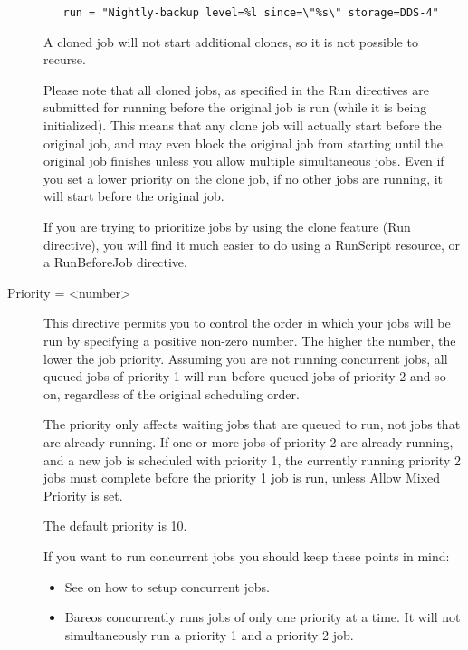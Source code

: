 \begin{description}
\begin{verbatim}
   run = "Nightly-backup level=%l since=\"%s\" storage=DDS-4"
\end{verbatim}

A cloned job will not start additional clones, so it is not
possible to recurse.

Please note that all cloned jobs, as specified in the Run directives are
submitted for running before the original job is run (while it is being
initialized). This means that any clone job will actually start before
the original job, and may even block the original job from starting
until the original job finishes unless you allow multiple simultaneous
jobs.  Even if you set a lower priority on the clone job, if no other
jobs are running, it will start before the original job.

If you are trying to prioritize jobs by using the clone feature (Run
directive), you will find it much easier to do using a RunScript
resource, or a RunBeforeJob directive.

\label{Priority}
\item [Priority = {\textless}number{\textgreater}]
This directive permits you to control the order in which your jobs will
be run by specifying a positive non-zero number. The higher the number,
the lower the job priority. Assuming you are not running concurrent jobs,
all queued jobs of priority 1 will run before queued jobs of priority 2
and so on, regardless of the original scheduling order.

The priority only affects waiting jobs that are queued to run, not jobs
that are already running.  If one or more jobs of priority 2 are already
running, and a new job is scheduled with priority 1, the currently
running priority 2 jobs must complete before the priority 1 job is
run, unless Allow Mixed Priority is set.

The default priority is 10.

If you want to run concurrent jobs you should
keep these points in mind:

\begin{itemize}
\item See  on how to setup
concurrent jobs.

\item Bareos concurrently runs jobs of only one priority at a time.  It
will not simultaneously run a priority 1 and a priority 2 job.


\end{itemize}
\end{description}
